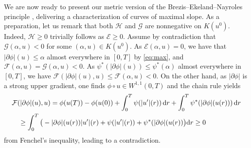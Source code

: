\documentclass[reqno]{amsart}
\newcommand{\dr}{{\rm d} r}
\renewcommand{\sl}{|\partial \phi|}
\newcommand{\GG}{{\mathcal G}}
\newcommand{\EE}{{\mathcal E}}
\newcommand{\FF}{{\mathcal F}}
\newcommand{\HH}{{\mathcal H}}
\begin{document}
We are now ready to present  our metric version of the Brezis--Ekeland--Nayroles principle \cite{Brezis-Ekeland76b,Brezis-Ekeland76,Nayroles76,Nayroles76b}, delivering a
characterization of
curves of maximal slope. 
As a preparation, let us remark that  both $\HH $ and
 $\GG$  are  nonnegative on
$K(u^0)$.  Indeed, $\HH \geq 0$ trivially follows as $\EE
\geq 0$. Assume  by contradiction that $\GG(\alpha, u)<0$ for some
$(\alpha , u) \in K(u^0)$. As $ \EE ( \alpha,u)=0$, we have  
  that $\sl( u) \leq \alpha $ almost everywhere in $[0,T]$  by \eqref{eq:max}, and
$\FF(\alpha,u)=\GG(\alpha,u)<0$.  As $\psi^*(\sl( u))\leq \psi^*(\alpha)$ almost everywhere in
 $[0,T]$, we have $\FF(\sl( u),  u)\leq \FF(\alpha,  u)<0$. On the other
 hand, as $\sl$ is a strong upper gradient, one finds 
 $\phi\circ u\in W^{1,1}(0,T)$ and the chain rule yields
 \begin{align*}
   &\FF(\sl( u) , u) = \phi( u(T))-\phi(u(0))+ \int_0^T \psi(| u'|(r))\,
   \dr + \int_0^T \psi^*(\sl( u(r)))\, \dr \\
   &\quad \geq \int_0^T \big( - \sl( u(r)) | u'|(r)
                       +\psi(| u'|(r))+\psi^*( \sl( u(r))\big)
                       \dr \geq 0
 \end{align*}
 from Fenchel's inequality, leading to a contradiction.

 
\end{document}
